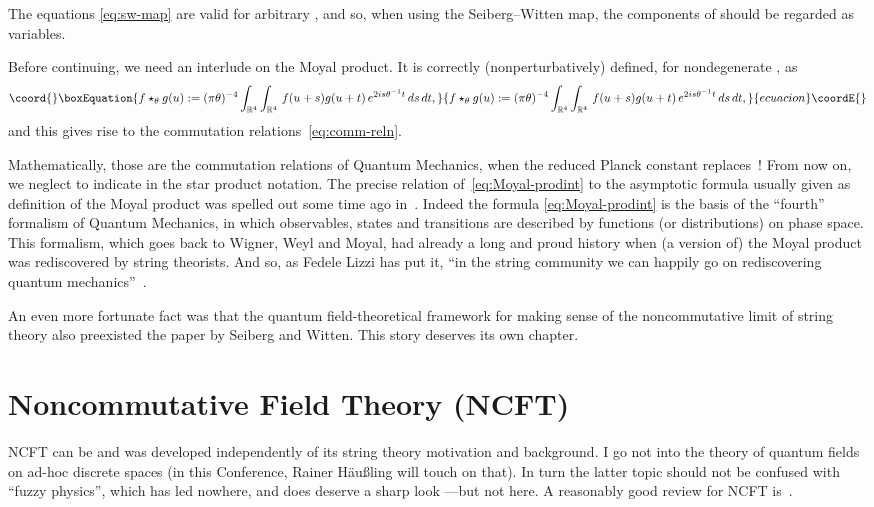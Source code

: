 \documentclass[a4paper,12pt]{article}
\providecommand{\R}{\mathbb{R}}         %
\providecommand{\1}{\mathbf{1}}         %
\providecommand{\7}{\dagger}            %
\providecommand{\8}{\bullet}            %
\renewcommand{\.}{\cdot}            %
\renewcommand{\:}{\colon}           %
\begin{document}
The equations \eqref{eq:sw-map} are valid for arbitrary \myHighlight{$\theta$}\coordHE{}, and 
so, when using the Seiberg--Witten map, the components of \myHighlight{$\theta$}\coordHE{} 
should be regarded as variables. 

\medskip

Before continuing, we need an interlude on the Moyal product. It is
correctly (nonperturbatively) defined, for nondegenerate \myHighlight{$\theta$}\coordHE{}, as
\begin{equation}\coord{}\boxEquation{
f \star_\theta g(u) := (\pi\theta)^{-4}
\int_{\R^4}\int_{\R^4}\,f(u + s)g(u + t)\,e^{2is\theta^{-1}t}\,ds\,dt,
\label{eq:Moyal-prodint}
}{
f \star_\theta g(u) := (\pi\theta)^{-4}
\int_{\R^4}\int_{\R^4}\,f(u + s)g(u + t)\,e^{2is\theta^{-1}t}\,ds\,dt,
}{ecuacion}\coordE{}\end{equation}
and this gives rise to the commutation relations~\eqref{eq:comm-reln}.

Mathematically, those are the commutation relations of Quantum
Mechanics, when the reduced Planck constant replaces~\myHighlight{$\theta$}\coordHE{}! From
now on, we neglect to indicate \myHighlight{$\theta$}\coordHE{} in the star product notation.
The precise relation of~\eqref{eq:Moyal-prodint} to the asymptotic
formula usually given as definition of the Moyal product was spelled
out some time ago in~\cite{Nereid}. Indeed the formula
\eqref{eq:Moyal-prodint} is the basis of the ``fourth'' formalism of
Quantum Mechanics, in which observables, states and transitions are
described by functions (or distributions) on phase space. This
formalism, which goes back to Wigner, Weyl and Moyal, had already a
long and proud history when (a version of) the Moyal product was
rediscovered by string theorists. And so, as Fedele Lizzi has put it,
``in the string community we can happily go on rediscovering quantum
mechanics''~\cite{LizziViewpoint}.

An even more fortunate fact was that the quantum field-theoretical
framework for making sense of the noncommutative limit of string
theory also preexisted the paper by Seiberg and Witten. This story
deserves its own chapter.


\section{Noncommutative Field Theory (NCFT)}

NCFT can be and was developed independently of its string theory
motivation and background. I go not into the theory of quantum fields
on ad-hoc discrete spaces (in this Conference, Rainer H\"au{\ss}ling
will touch on that). In turn the latter topic should not be confused
with ``fuzzy physics'', which has led nowhere, and does deserve a
sharp look ---but not here. A reasonably good review for NCFT
is~\cite{DouglasN}.
\end{document}

